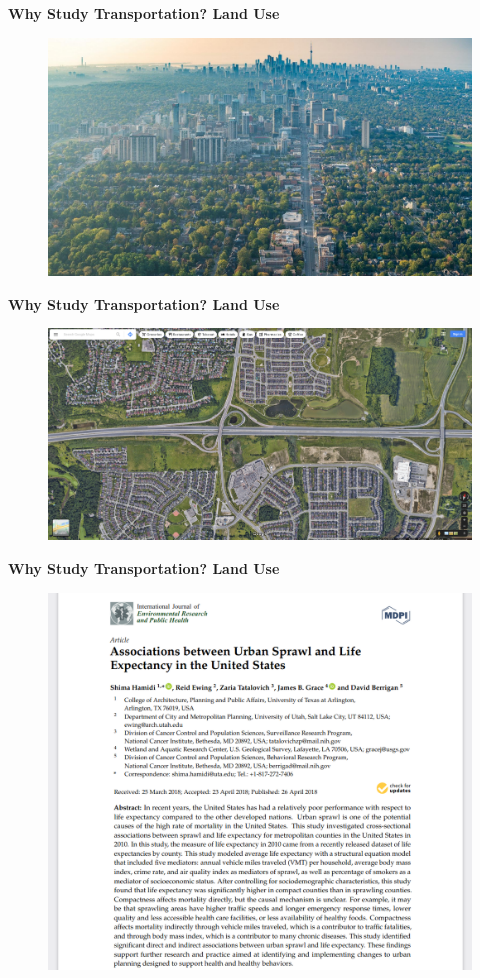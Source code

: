 \documentclass[aspectratio=169]{beamer}
\begin{document}
\begin{frame}
	\textbf{Why Study Transportation? Land Use}
	\begin{figure}
		\centering
		\includegraphics[width=0.9\linewidth]{images/i3.png}
	\end{figure}
\end{frame}

\begin{frame}
	\textbf{Why Study Transportation? Land Use}
	\begin{figure}
		\centering
		\includegraphics[width=0.9\linewidth]{images/sprawl_markham407.png}
	\end{figure}
\end{frame}


\begin{frame}
	\textbf{Why Study Transportation? Land Use}
	\begin{figure}
		\centering
		\includegraphics[width=0.6\linewidth]{images/sprawl_life_expectancy.png}
	\end{figure}
\end{frame}
\end{document}
